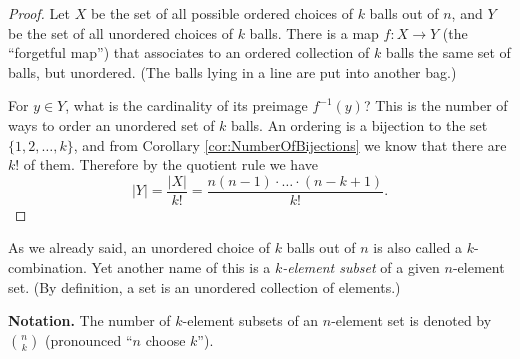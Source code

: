 \begin{proof}
Let $X$ be the set of all possible ordered choices of $k$ balls out of $n$,
and $Y$ be the set of all unordered choices of $k$ balls.
There is a map $f \colon X \to Y$ (the ``forgetful map'') that associates to
an ordered collection of $k$ balls the same set of balls, but unordered.
(The balls lying in a line are put into another bag.)

For $y \in Y$, what is the cardinality of its preimage $f^{-1}(y)$?
This is the number of ways to order an unordered set of $k$ balls.
An ordering is a bijection to the set $\{1, 2, \ldots, k\}$, and from Corollary \ref{cor:NumberOfBijections} we know that there are $k!$ of them.
Therefore by the quotient rule we have
\[
|Y| = \frac{|X|}{k!} = \frac{n(n-1)\cdot \ldots \cdot (n-k+1)}{k!}.
\]
\end{proof}

As we already said, an unordered choice of $k$ balls out of $n$ is also called a $k$-combination.
Yet another name of this is a \emph{$k$-element subset} of a given $n$-element set.
(By definition, a set is an unordered collection of elements.)

\smallskip

\noindent\textbf{Notation.}
The number of $k$-element subsets of an $n$-element set is denoted by $\binom{n}{k}$
(pronounced ``$n$ choose $k$'').


